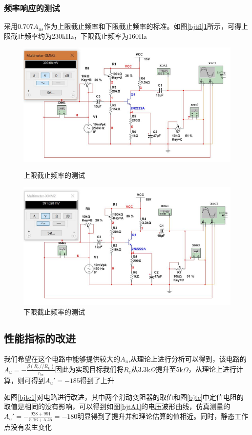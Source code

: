 \documentclass[UTF8,a4paper]{ctexart}
\begin{document}
\subsubsection{频率响应的测试}
采用$0.707A_{us}$作为上限截止频率和下限截止频率的标准。如图\ref{bjtfl}\ref{bjtfh}所示，可得上限截止频率约为230kHz，下限截止频率为160Hz
\begin{figure}
\centering
\includegraphics[width=\textwidth]{1-2fh.jpg}
\caption{上限截止频率的测试}
\label{bjtfl}
\includegraphics[width=\textwidth]{1-2fl.jpg}
\caption{下限截止频率的测试}
\label{bjtfh}
\end{figure}
\subsection{性能指标的改进}
我们希望在这个电路中能够提供较大的$A_u$,从理论上进行分析可以得到，该电路的$A_u=-\frac{\beta(R_c//R_L)}{r_{be}}$因此为实现目标我们将$R_c$从3.3$\mathrm{k}\Omega$提升至5$\mathrm{k}\Omega$，从理论上进行计算，则可得到$A_u'=-185$得到了上升

如图\ref{bjtc1}对电路进行改进，其中两个滑动变阻器的取值和图\ref{bjtc}中定值电阻的取值是相同的没有影响，可以得到如图\ref{bjtA1}的电压波形曲线，仿真测量的$A_u'=-\frac{928+991}{5.16+5.45}=-180$明显得到了提升并和理论估算的值相近。同时，静态工作点没有发生变化
\end{document}

